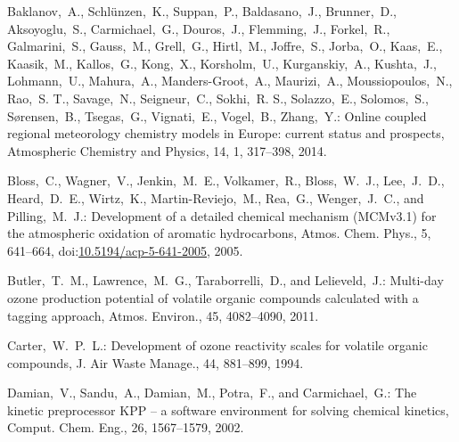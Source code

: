 \documentclass[acpd, online, hvmath]{copernicus}
\begin{document}
\begin{thebibliography}{34}
     Baklanov,~A., Schl{\"u}nzen,~K., Suppan,~P.,
    Baldasano,~J., Brunner,~D., Aksoyoglu,~S., Carmichael,~G., Douros,~J., Flemming,~J., 
    Forkel,~R., Galmarini,~S., Gauss,~M., Grell,~G., Hirtl,~M., Joffre,~S., Jorba,~O., 
    Kaas,~E., Kaasik,~M., Kallos,~G., Kong,~X., Korsholm,~U., Kurganskiy,~A., Kushta,~J., 
    Lohmann,~U., Mahura,~A., Manders-Groot,~A., Maurizi,~A., Moussiopoulos,~N., Rao,~S. T.,
    Savage,~N., Seigneur,~C., Sokhi,~R. S., Solazzo,~E., Solomos,~S., S{\o}rensen,~B., 
    Tsegas,~G., Vignati,~E., Vogel,~B., Zhang,~Y.: Online coupled regional meteorology 
    chemistry models in Europe: current status and prospects, Atmospheric Chemistry and
    Physics, 14, 1, 317--398, 2014.


 Bloss,~C., Wagner,~V., Jenkin,~M.~E.,
  Volkamer,~R., Bloss,~W.~J., Lee,~J.~D., Heard,~D.~E., Wirtz,~K.,
  Martin-Reviejo,~M., Rea,~G., Wenger,~J.~C., and Pilling,~M.~J.:
  Development of a detailed chemical mechanism (MCMv3.1) for the
  atmospheric oxidation of aromatic hydrocarbons, Atmos. Chem. Phys.,
  5, 641--664,
doi:\href{http://dx.doi.org/10.5194/acp-5-641-2005}{10.5194/acp-5-641-2005},
  2005.



 Butler,~T.~M., Lawrence,~M.~G.,
  Taraborrelli,~D., and Lelieveld,~J.: {Multi-day ozone production
    potential of volatile organic compounds calculated with a tagging
    approach}, Atmos. Environ., 45, 4082--4090, 2011.


 Carter,~W.~P.~L.: {Development
    of ozone reactivity scales for volatile organic compounds}, J. Air
  Waste Manage., 44, 881--899, 1994.


 Damian,~V., Sandu,~A., Damian,~M.,
  Potra,~F., and Carmichael,~G.: {The kinetic preprocessor KPP -- a
    software environment for solving chemical kinetics},
  Comput. Chem. Eng., 26, 1567--1579, 2002.



\end{thebibliography}
\end{document}
